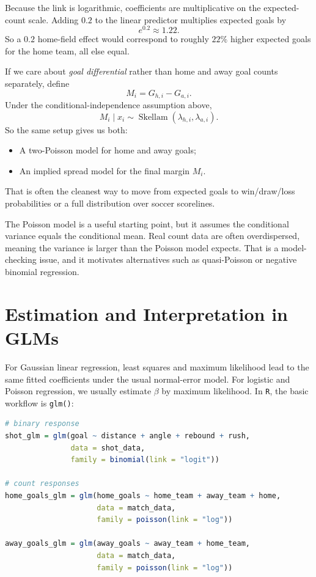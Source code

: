 \documentclass[twoside]{article}
\theoremstyle{definition}
\begin{document}
Because the link is logarithmic, coefficients are multiplicative on the expected-count scale. Adding $0.2$ to the linear predictor multiplies expected goals by
\[
    e^{0.2} \approx 1.22.
\]
So a $0.2$ home-field effect would correspond to roughly $22\%$ higher expected goals for the home team, all else equal.

If we care about \emph{goal differential} rather than home and away goal counts separately, define
\[
    M_i = G_{h,i} - G_{a,i}.
\]
Under the conditional-independence assumption above,
\[
    M_i \mid x_i \sim \operatorname{Skellam}(\lambda_{h,i}, \lambda_{a,i}).
\]
So the same setup gives us both:
\begin{itemize}
    \item[-] A two-Poisson model for home and away goals;
    \item[-] An implied spread model for the final margin $M_i$.
\end{itemize}
That is often the cleanest way to move from expected goals to win/draw/loss probabilities or a full distribution over soccer scorelines.

The Poisson model is a useful starting point, but it assumes the conditional variance equals the conditional mean. Real count data are often overdispersed, meaning the variance is larger than the Poisson model expects. That is a model-checking issue, and it motivates alternatives such as quasi-Poisson or negative binomial regression.

\section{Estimation and Interpretation in GLMs}

For Gaussian linear regression, least squares and maximum likelihood lead to the same fitted coefficients under the usual normal-error model. For logistic and Poisson regression, we usually estimate $\beta$ by maximum likelihood. In \texttt{R}, the basic workflow is \texttt{glm()}:
\begin{lstlisting}[language=R]
# binary response
shot_glm = glm(goal ~ distance + angle + rebound + rush,
               data = shot_data,
               family = binomial(link = "logit"))

# count responses
home_goals_glm = glm(home_goals ~ home_team + away_team + home,
                     data = match_data,
                     family = poisson(link = "log"))

away_goals_glm = glm(away_goals ~ away_team + home_team,
                     data = match_data,
                     family = poisson(link = "log"))
\end{lstlisting}
\end{document}
